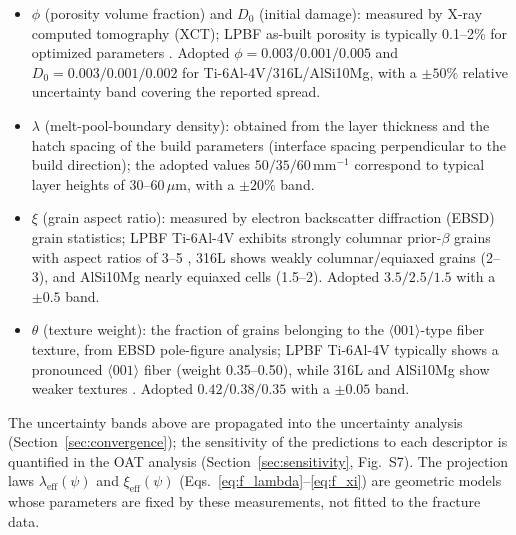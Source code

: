 \begin{itemize}
    \item $\phi$ (porosity volume fraction) and $D_0$ (initial damage): measured by X-ray computed tomography (XCT); LPBF as-built porosity is typically 0.1--2\% for optimized parameters \cite{liu2022phase}. Adopted $\phi = 0.003/0.001/0.005$ and $D_0 = 0.003/0.001/0.002$ for Ti-6Al-4V/316L/AlSi10Mg, with a $\pm50\%$ relative uncertainty band covering the reported spread.
    \item $\lambda$ (melt-pool-boundary density): obtained from the layer thickness and the hatch spacing of the build parameters (interface spacing perpendicular to the build direction); the adopted values $50/35/60$\,mm$^{-1}$ correspond to typical layer heights of 30--60\,$\mu$m, with a $\pm20\%$ band.
    \item $\xi$ (grain aspect ratio): measured by electron backscatter diffraction (EBSD) grain statistics; LPBF Ti-6Al-4V exhibits strongly columnar prior-$\beta$ grains with aspect ratios of 3--5 \cite{carroll2015anisotropic}, 316L shows weakly columnar/equiaxed grains (2--3), and AlSi10Mg nearly equiaxed cells (1.5--2). Adopted $3.5/2.5/1.5$ with a $\pm0.5$ band.
    \item $\theta$ (texture weight): the fraction of grains belonging to the $\langle001\rangle$-type fiber texture, from EBSD pole-figure analysis; LPBF Ti-6Al-4V typically shows a pronounced $\langle001\rangle$ fiber (weight 0.35--0.50), while 316L and AlSi10Mg show weaker textures \cite{carroll2015anisotropic,jaskari2021materials_316l}. Adopted $0.42/0.38/0.35$ with a $\pm0.05$ band.
\end{itemize}

The uncertainty bands above are propagated into the uncertainty analysis (Section~\ref{sec:convergence}); the sensitivity of the predictions to each descriptor is quantified in the OAT analysis (Section~\ref{sec:sensitivity}, Fig.~S7). The projection laws $\lambda_{\mathrm{eff}}(\psi)$ and $\xi_{\mathrm{eff}}(\psi)$ (Eqs.~\eqref{eq:f_lambda}--\eqref{eq:f_xi}) are geometric models whose parameters are fixed by these measurements, not fitted to the fracture data.


